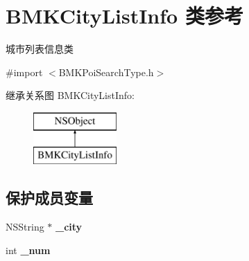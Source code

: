\hypertarget{interface_b_m_k_city_list_info}{\section{B\-M\-K\-City\-List\-Info 类参考}
\label{interface_b_m_k_city_list_info}
}


城市列表信息类  




{\ttfamily \#import $<$B\-M\-K\-Poi\-Search\-Type.\-h$>$}

继承关系图 B\-M\-K\-City\-List\-Info\-:\begin{figure}[H]
\begin{center}
\leavevmode
\includegraphics[height=2.000000cm]{interface_b_m_k_city_list_info}
\end{center}
\end{figure}
\subsection*{保护成员变量}
\begin{DoxyCompactItemize}
\item 
\hypertarget{interface_b_m_k_city_list_info_a868f1df35a24867c0957420506703225}{N\-S\-String $\ast$ {\bfseries \-\_\-city}}\label{interface_b_m_k_city_list_info_a868f1df35a24867c0957420506703225}

\item 
\hypertarget{interface_b_m_k_city_list_info_a0cc9abd0bfad17b52c924611f975db77}{int {\bfseries \-\_\-num}}\label{interface_b_m_k_city_list_info_a0cc9abd0bfad17b52c924611f975db77}

\end{DoxyCompactItemize}
